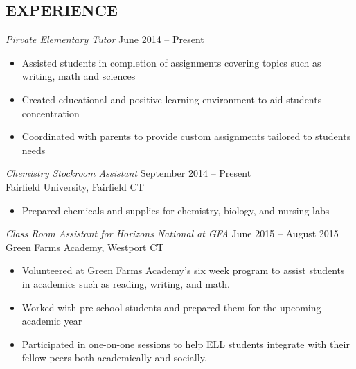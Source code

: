 \documentclass[margin, 10pt]{res}
\begin{document}
\begin{resume}
\section{EXPERIENCE}
{\sl Pirvate Elementary Tutor} \hfill June 2014 -- Present\\
\begin{itemize} \itemsep -1.5pt %
  \item Assisted students in completion of assignments covering topics such as writing, math and sciences
  \item Created educational and positive learning environment to aid students concentration
  \item Coordinated with parents to provide custom assignments tailored to students needs
\end{itemize}
%
{\sl Chemistry Stockroom Assistant} \hfill September 2014 -- Present \\
{\small{Fairfield University, Fairfield CT}}
\begin{itemize} \itemsep -1.5pt %
  \item Prepared chemicals and supplies for chemistry, biology, and nursing labs
\end{itemize}
%
{\sl Class Room Assistant for Horizons National at GFA} \hfill June 2015 -- August 2015 \\
{\small{Green Farms Academy, Westport CT}}
\begin{itemize} \itemsep -1.5pt %
  \item Volunteered at Green Farms Academy's six week program to assist students in academics such as reading, writing, and math.
  \item Worked with pre-school students and prepared them for the upcoming academic year
  \item Participated in one-on-one sessions to help ELL students integrate with their fellow peers both academically and socially. 
\end{itemize}
%

\end{resume}
\end{document}
